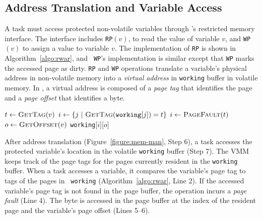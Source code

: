 \subsection{Address Translation and Variable Access}
%
A task must access protected non-volatile variables through \sys's
restricted memory interface. The interface includes \texttt{RP}$(v)$, to read the value of variable
$v$, and \texttt{WP}$(v)$ to assign a value to variable $v$. The
implementation of {\tt RP} is shown in Algorithm~\ref{algo:rwar}, and {\tt
WP}'s implementation is similar except that {\tt WP} marks the accessed page as
dirty.
%
{\tt RP} and {\tt WP} operations translate a variable's physical address in
non-volatile memory into a \emph{virtual address} in \texttt{working} buffer in
volatile memory. In \sys, a virtual address is composed of a \emph{page tag}
that identifies the page and a \emph{page offset} that identifies a byte.
%
\begin{algorithm}[t]
    \label{algo:rwar}
    \scriptsize
    \begin{algorithmic}[1]
		\State $t \leftarrow \Call{GetTag}{v}$
        \State $i \gets \{ j\ |\ \Call{GetTag}{\texttt{working}[j]} = t \}$ 
		 
		\State	$i \gets \Call{PageFault}{t}$ 
		\EndIf
		\State $o \leftarrow \Call{GetOffset}{v}$
		\State \Return \texttt{working}[$i$][$o$]  
	\end{algorithmic}
\end{algorithm}
%
After address translation (Figure~\ref{figure:mem-man}, Step 6), a task
accesses the protected variable's location in the volatile \texttt{working} buffer
(Step 7). The VMM keeps track of the page tags for
the pages currently resident in the \texttt{working} buffer. When a task accesses a
variable, it compares the variable's page tag to tags of the pages in {\tt
working} (Algorithm~\ref{algo:rwar}, Line 2).
%
If the accessed variable's page tag is not found in the page buffer, the
operation incurs a {\em page fault} (Line 4).
%
The byte is accessed in the page buffer at the index of the resident page and
the variable's page offset (Lines 5--6).
%
